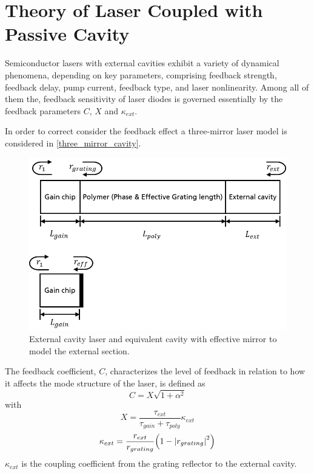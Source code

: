 \chapter{Theory of Laser Coupled with Passive Cavity}
\label{ch:theory}
Semiconductor lasers with external cavities exhibit a variety of dynamical phenomena, depending on key parameters, comprising feedback strength, feedback delay, pump current, feedback type, and laser nonlinearity\cite{}. Among all of them the, feedback sensitivity of laser diodes is governed essentially by the feedback parameters $C$, $X$ and $\kappa_{ext}$.

In order to correct consider the feedback effect a three-mirror laser model is considered in \autoref{three_mirror_cavity}. 
\begin{figure}[ht]
    \centering
    \includegraphics[width=12cm]{figures/laser_cavity_model.png}
    \caption{External cavity laser and equivalent cavity with effective mirror to model the external section.}
    \label{three_mirror_cavity}
\end{figure}

The feedback coefficient, $C$, characterizes the level of feedback in relation to how it affects the mode structure of the laser, is defined as
\begin{equation}
    C=X\sqrt{1+\alpha^2}
\end{equation}
with
\begin{equation}
    X=\frac{\tau_{ext}}{\tau_{gain}+\tau_{poly}}\kappa_{ext}
\end{equation}
\begin{equation}
    \kappa_{ext}=\frac{r_{ext}}{r_{grating}}\qty(1-\abs{r_{grating}}^2)
\end{equation}
$\kappa_{ext}$ is the coupling coefficient from the grating reflector to the external cavity.


